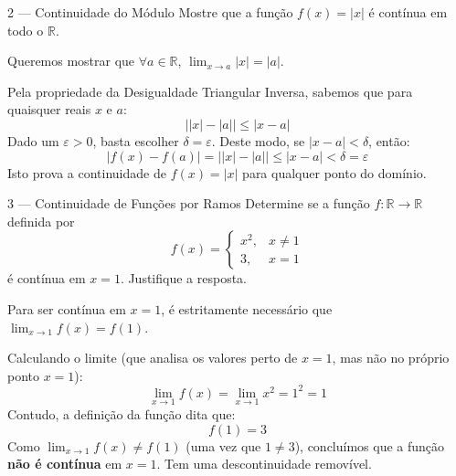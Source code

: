 \begin{exercisebox}{2 --- Continuidade do Módulo}
  Mostre que a função $f(x)=|x|$ é contínua em todo o $\mathbb{R}$.
\end{exercisebox}
\begin{solbox}
  Queremos mostrar que $\forall a \in \mathbb{R}$, $\lim_{x\to a} |x| = |a|$.
  
  Pela propriedade da Desigualdade Triangular Inversa, sabemos que para quaisquer reais $x$ e $a$:
  \[
    \bigl| |x| - |a| \bigr| \le |x-a|
  \]
  Dado um $\varepsilon > 0$, basta escolher $\delta = \varepsilon$. 
  Deste modo, se $|x-a| < \delta$, então:
  \[
    |f(x) - f(a)| = \bigl| |x| - |a| \bigr| \le |x-a| < \delta = \varepsilon
  \]
  Isto prova a continuidade de $f(x)=|x|$ para qualquer ponto do domínio.
\end{solbox}

\begin{exercisebox}{3 --- Continuidade de Funções por Ramos}
  Determine se a função $f:\mathbb{R}\to\mathbb{R}$ definida por
  \[
    f(x)=\begin{cases}
    x^2, & x\neq 1\\
    3, & x=1
    \end{cases}
  \]
  é contínua em $x=1$. Justifique a resposta.
\end{exercisebox}
\begin{solbox}
  Para ser contínua em $x=1$, é estritamente necessário que $\lim_{x \to 1} f(x) = f(1)$.
  
  Calculando o limite (que analisa os valores perto de $x=1$, mas não no próprio ponto $x=1$):
  \[
    \lim_{x \to 1} f(x) = \lim_{x \to 1} x^2 = 1^2 = 1
  \]
  Contudo, a definição da função dita que:
  \[
    f(1) = 3
  \]
  Como $\lim_{x \to 1} f(x) \neq f(1)$ (uma vez que $1 \neq 3$), concluímos que a função \textbf{não é contínua} em $x=1$. Tem uma descontinuidade removível.
\end{solbox}

